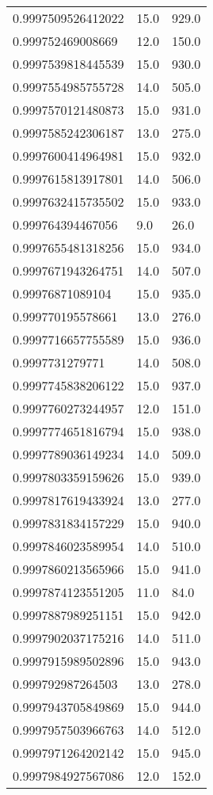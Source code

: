 \begin{center}
\begin{supertabular}[H]{p{0.30\textwidth}p{0.05\textwidth}p{0.05\textwidth}}
0.9997509526412022 & 15.0 & 929.0 \\ 
0.999752469008669 & 12.0 & 150.0 \\ 
0.9997539818445539 & 15.0 & 930.0 \\ 
0.9997554985755728 & 14.0 & 505.0 \\ 
0.9997570121480873 & 15.0 & 931.0 \\ 
0.9997585242306187 & 13.0 & 275.0 \\ 
0.9997600414964981 & 15.0 & 932.0 \\ 
0.9997615813917801 & 14.0 & 506.0 \\ 
0.9997632415735502 & 15.0 & 933.0 \\ 
0.999764394467056 & 9.0 & 26.0 \\ 
0.9997655481318256 & 15.0 & 934.0 \\ 
0.9997671943264751 & 14.0 & 507.0 \\ 
0.99976871089104 & 15.0 & 935.0 \\ 
0.999770195578661 & 13.0 & 276.0 \\ 
0.9997716657755589 & 15.0 & 936.0 \\ 
0.9997731279771 & 14.0 & 508.0 \\ 
0.9997745838206122 & 15.0 & 937.0 \\ 
0.9997760273244957 & 12.0 & 151.0 \\ 
0.9997774651816794 & 15.0 & 938.0 \\ 
0.9997789036149234 & 14.0 & 509.0 \\ 
0.9997803359159626 & 15.0 & 939.0 \\ 
0.9997817619433924 & 13.0 & 277.0 \\ 
0.9997831834157229 & 15.0 & 940.0 \\ 
0.9997846023589954 & 14.0 & 510.0 \\ 
0.9997860213565966 & 15.0 & 941.0 \\ 
0.9997874123551205 & 11.0 & 84.0 \\ 
0.9997887989251151 & 15.0 & 942.0 \\ 
0.9997902037175216 & 14.0 & 511.0 \\ 
0.9997915989502896 & 15.0 & 943.0 \\ 
0.999792987264503 & 13.0 & 278.0 \\ 
0.9997943705849869 & 15.0 & 944.0 \\ 
0.9997957503966763 & 14.0 & 512.0 \\ 
0.9997971264202142 & 15.0 & 945.0 \\ 
0.9997984927567086 & 12.0 & 152.0 \\ 

\end{supertabular}
\end{center}
